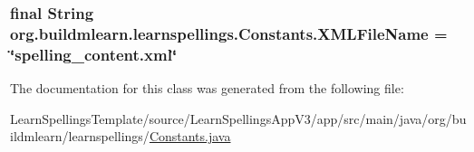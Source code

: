 \subsubsection[{\texorpdfstring{X\+M\+L\+File\+Name}{XMLFileName}}]{\setlength{\rightskip}{0pt plus 5cm}final String org.\+buildmlearn.\+learnspellings.\+Constants.\+X\+M\+L\+File\+Name = \char`\"{}spelling\+\_\+content.\+xml\char`\"{}\hspace{0.3cm}{\ttfamily [static]}}\hypertarget{classorg_1_1buildmlearn_1_1learnspellings_1_1Constants_ad11ecec6bb55020516dd2c21de79d350}{}\label{classorg_1_1buildmlearn_1_1learnspellings_1_1Constants_ad11ecec6bb55020516dd2c21de79d350}


The documentation for this class was generated from the following file\+:\begin{DoxyCompactItemize}
\item 
Learn\+Spellings\+Template/source/\+Learn\+Spellings\+App\+V3/app/src/main/java/org/buildmlearn/learnspellings/\hyperlink{LearnSpellingsTemplate_2source_2LearnSpellingsAppV3_2app_2src_2main_2java_2org_2buildmlearn_2learnspellings_2Constants_8java}{Constants.\+java}\end{DoxyCompactItemize}
